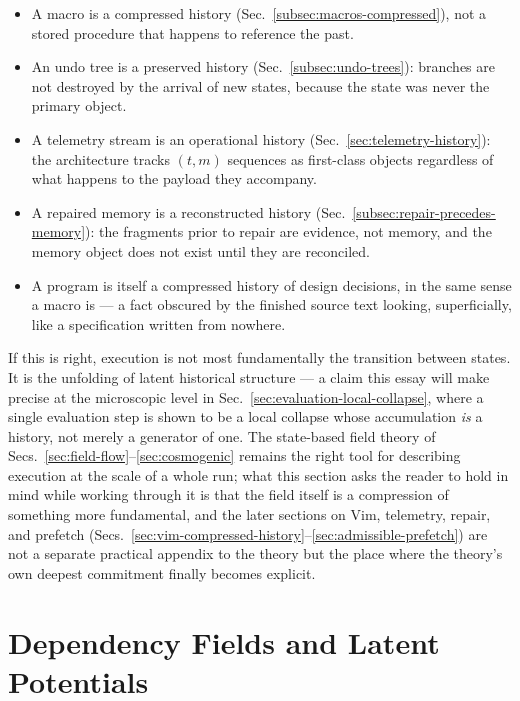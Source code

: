\documentclass[12pt,a4paper]{article}
\theoremstyle{plain}
\theoremstyle{definition}
\theoremstyle{remark}
\begin{document}
\begin{itemize}
  \item A macro is a compressed history (Sec.~\ref{subsec:macros-compressed}), not a stored procedure that happens to reference the past.
  \item An undo tree is a preserved history (Sec.~\ref{subsec:undo-trees}): branches are not destroyed by the arrival of new states, because the state was never the primary object.
  \item A telemetry stream is an operational history (Sec.~\ref{sec:telemetry-history}): the architecture tracks $(t,m)$ sequences as first-class objects regardless of what happens to the payload they accompany.
  \item A repaired memory is a reconstructed history (Sec.~\ref{subsec:repair-precedes-memory}): the fragments prior to repair are evidence, not memory, and the memory object does not exist until they are reconciled.
  \item A program is itself a compressed history of design decisions, in the same sense a macro is — a fact obscured by the finished source text looking, superficially, like a specification written from nowhere.
\end{itemize}

If this is right, execution is not most fundamentally the transition between states. It is the unfolding of latent historical structure — a claim this essay will make precise at the microscopic level in Sec.~\ref{sec:evaluation-local-collapse}, where a single evaluation step is shown to be a local collapse whose accumulation \emph{is} a history, not merely a generator of one. The state-based field theory of Secs.~\ref{sec:field-flow}--\ref{sec:cosmogenic} remains the right tool for describing execution at the scale of a whole run; what this section asks the reader to hold in mind while working through it is that the field itself is a compression of something more fundamental, and the later sections on Vim, telemetry, repair, and prefetch (Secs.~\ref{sec:vim-compressed-history}--\ref{sec:admissible-prefetch}) are not a separate practical appendix to the theory but the place where the theory's own deepest commitment finally becomes explicit.

\section{Dependency Fields and Latent Potentials}
\label{sec:dependency-fields}
\end{document}
